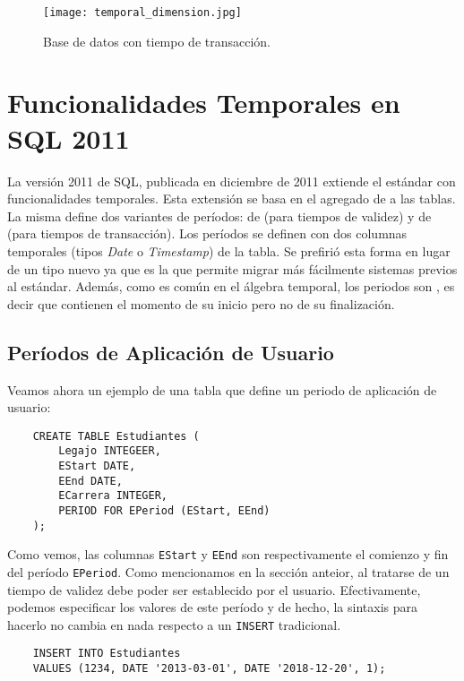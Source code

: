 \begin{figure}
    \centering
    \texttt{[image: temporal\_dimension.jpg]}
    \caption{Base de datos con tiempo de transacción.}
    \label{fig:transaction-time}
\end{figure}

\section{Funcionalidades Temporales en SQL 2011}\label{sec:sql2011}

La versión 2011 de SQL\textsuperscript{\cite{sql2011}}, publicada en diciembre de 2011 extiende el estándar con funcionalidades temporales.
Esta extensión se basa en el agregado de  a las tablas.
La misma define dos variantes de períodos:
de  (para tiempos de validez) y de  (para tiempos de transacción).
Los períodos se definen con dos columnas temporales (tipos \textit{Date} o \textit{Timestamp}) de la tabla.
Se prefirió esta forma en lugar de un tipo nuevo ya que es la que permite migrar más
fácilmente sistemas previos al estándar.
Además, como es común en el álgebra temporal, los periodos son ,
es decir que contienen el momento de su inicio pero no de su finalización.

\subsection{Períodos de Aplicación de Usuario} \label{subsec:pau}

Veamos ahora un ejemplo de una tabla que define un periodo de aplicación de usuario:

\begin{verbatim}
    CREATE TABLE Estudiantes (
        Legajo INTEGEER,
        EStart DATE,
        EEnd DATE,
        ECarrera INTEGER,
        PERIOD FOR EPeriod (EStart, EEnd)
    );
\end{verbatim}

Como vemos, las columnas \texttt{EStart} y \texttt{EEnd} son respectivamente el comienzo y fin del período \texttt{EPeriod}.
Como mencionamos en la sección anteior, al tratarse de un tiempo de validez debe poder ser establecido por el usuario.
Efectivamente, podemos especificar los valores de este período y de hecho,
la sintaxis para hacerlo no cambia en nada respecto a un \texttt{INSERT} tradicional.

\begin{verbatim}
    INSERT INTO Estudiantes
    VALUES (1234, DATE '2013-03-01', DATE '2018-12-20', 1);
\end{verbatim}

